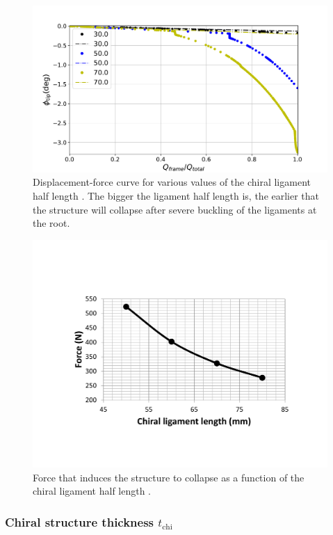       \begin{figure}[!htpb] %
        \centering
        \includegraphics[width=0.8 \textwidth]{../figures/result-sim/L/force_displacement-far}
        \caption[Displacement-force curve for various values of the chiral ligament half length]{Displacement-force curve for various values of the chiral ligament half length \chiL. The bigger the ligament half length is, the earlier that the structure will collapse after severe buckling of the ligaments at the root.}\label{fig:forceDisplacement-far-L}
      \end{figure}

      \begin{figure}[!htpb] %
        \centering
        \includegraphics[width=0.8 \textwidth]{../figures/result-sim/L/force_L}
        \caption[Force that induces the structure to collapse as a function of the chiral ligament half length]{Force that induces the structure to collapse as a function of the chiral ligament half length \chiL.}\label{fig:force_L}
      \end{figure}

    \clearpage
    \subsubsection{Chiral structure thickness $t_{\mathrm{chi}}$}

